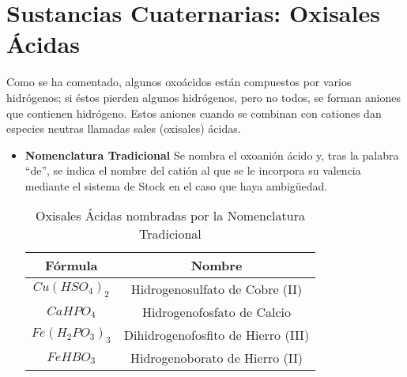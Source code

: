 \section{Sustancias Cuaternarias: Oxisales Ácidas}
Como se ha comentado, algunos oxoácidos están compuestos por varios hidrógenos; si éstos pierden algunos hidrógenos, pero no todos, se forman aniones que contienen hidrógeno. Estos aniones cuando se combinan con cationes dan especies neutras llamadas sales (oxisales) ácidas.\\
\begin{itemize}
	\item \textbf{Nomenclatura Tradicional} Se nombra el oxoanión ácido y, tras la palabra “de”, se indica el nombre del catión al que se le incorpora su valencia mediante el sistema de Stock en el caso que haya ambigüedad.
	\begin{table}[h!]
		\centering
		\begin{tabular}{c|c}
			Fórmula&Nombre\\ \hline
			$Cu(HSO_4)_2$&Hidrogenosulfato de Cobre (II)\\
			$CaHPO_4$&Hidrogenofosfato de Calcio\\
			$Fe(H_2PO_3)_3$&Dihidrogenofosfito de Hierro (III)\\
			$FeHBO_3$&Hidrogenoborato de Hierro (II)\\ \hline
		\end{tabular}
		\caption{Oxisales Ácidas nombradas por la Nomenclatura Tradicional}
	\end{table}


\end{itemize}
